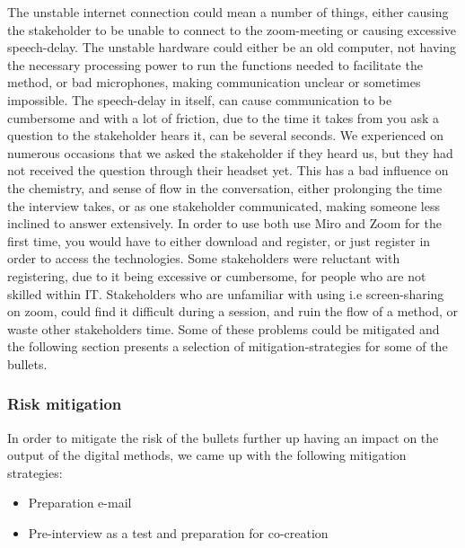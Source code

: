 The unstable internet connection could mean a number of things, either causing the stakeholder to be unable to connect to the zoom-meeting or causing excessive speech-delay. The unstable hardware could either be an old computer, not having the necessary processing power to run the functions needed to facilitate the method, or bad microphones, making communication unclear or sometimes impossible. The speech-delay in itself, can cause communication to be cumbersome and with a lot of friction, due to the time it takes from you ask a question to the stakeholder hears it, can be several seconds. We experienced on numerous occasions that we asked the stakeholder if they heard us, but they had not received the question through their headset yet. This has a bad influence on the chemistry, and sense of flow in the conversation, either prolonging the time the interview takes, or as one stakeholder communicated, making someone less inclined to answer extensively. In order to use both use Miro and Zoom for the first time, you would have to either download and register, or just register in order to access the technologies. Some stakeholders were reluctant with registering, due to it being excessive or cumbersome, for people who are not skilled within IT. Stakeholders who are unfamiliar with using i.e screen-sharing on zoom, could find it difficult during a session, and ruin the flow of a method, or waste other stakeholders time. Some of these problems could be mitigated and the following section presents a selection of mitigation-strategies for some of the bullets.

\subsubsection{Risk mitigation}

In order to mitigate the risk of the bullets further up having an impact on the output of the digital methods, we came up with the following mitigation strategies:

\begin{itemize}
    \item Preparation e-mail
    \item Pre-interview as a test and preparation for co-creation
\end{itemize}

